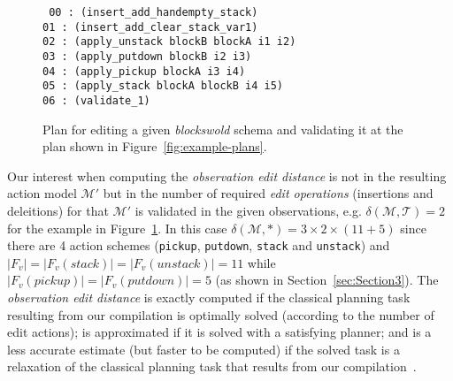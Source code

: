 \documentclass[letterpaper]{article} %
\begin{document}
\begin{figure}[hbt!]
{\tt\scriptsize
00 : (insert\_add\_handempty\_stack)\\
01 : (insert\_add\_clear\_stack\_var1)\\
02 : (apply\_unstack blockB blockA i1 i2)\\
03 : (apply\_putdown blockB i2 i3)\\
04 : (apply\_pickup blockA i3 i4)\\
05 : (apply\_stack blockA blockB i4 i5)\\
06 : (validate\_1)
}
 \caption{\small Plan for editing a given {\em blockswold} schema and validating it at the plan shown in Figure~\ref{fig:example-plans}.}
\label{fig:plan-pdistance}
\end{figure}

Our interest when computing the {\em observation edit distance} is not in the resulting action model $\mathcal{M}'$ but in the number of required {\em edit operations} (insertions and deleitions) for that $\mathcal{M}'$ is validated in the given observations, e.g. $\delta(\mathcal{M},\mathcal{T})=2$ for the example in Figure~\ref{fig:plan-pdistance}. In this case $\delta(\mathcal{M},*)=3\times 2\times (11+5)$ since there are 4 action schemes ({\small\tt pickup}, {\small\tt putdown}, {\small\tt stack} and {\small\tt unstack}) and $|F_v|=|F_v(stack)|=|F_v(unstack)|=11$ while $|F_v(pickup)|=|F_v(putdown)|=5$  (as shown in Section~\ref{sec:Section3}). The {\em observation edit distance} is exactly computed if the classical planning task resulting from our compilation is optimally solved (according to the number of edit actions); is approximated if it is solved with a satisfying planner; and is a less accurate estimate (but faster to be computed) if the solved task is a relaxation of the classical planning task that results from our compilation~\cite{bonet2001planning}.
\end{document}
